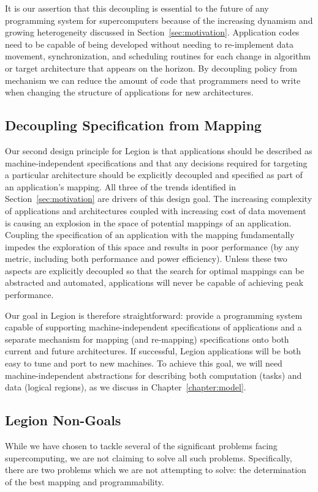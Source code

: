 It is our assertion that this decoupling is
essential to the future of any programming 
system for supercomputers because
of the increasing dynamism and growing 
heterogeneity discussed in Section~\ref{sec:motivation}.
Application codes need to be capable of being
developed without needing to re-implement
data movement, synchronization,
and scheduling routines for each change in
algorithm or target architecture that
appears on the horizon. By decoupling policy
from mechanism we can reduce the amount of
code that programmers need to write 
when changing the structure of applications
for new architectures.

\subsection{Decoupling Specification from Mapping}
\label{subsec:specification}
Our second design principle for Legion is that
applications should be described as 
machine-independent specifications and that 
any decisions required for targeting a particular
architecture should be explicitly decoupled and
specified as part of an application's mapping.
All three of the trends identified in 
Section~\ref{sec:motivation} are drivers of
this design goal. The increasing complexity
of applications and architectures coupled with
increasing cost of data movement is causing
an explosion in the space of
potential mappings of an application. Coupling
the specification of an application with the
mapping fundamentally impedes the exploration
of this space and results in poor performance 
(by any metric, including both performance
and power efficiency).  Unless these two
aspects are explicitly decoupled so that the
search for optimal mappings can be abstracted 
and automated, applications will never be capable 
of achieving peak performance.

Our goal in Legion is therefore 
straightforward: provide a programming system
capable of supporting machine-independent 
specifications of applications and a separate
mechanism for mapping (and re-mapping) specifications 
onto both current and future architectures.
If successful, Legion applications will be both
easy to tune and port to new
machines. To achieve this goal, we will need 
machine-independent abstractions for describing
both computation (tasks) and data (logical
regions), as we discuss in Chapter~\ref{chapter:model}.

\subsection{Legion Non-Goals}
\label{subsec:nongoals}
While we have chosen to tackle several of the
significant problems facing supercomputing, we are
not claiming to solve all such problems. Specifically, 
there are two problems which we are not attempting to 
solve: the determination of the best mapping and programmability. 


